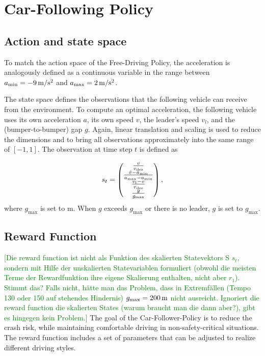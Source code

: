 \documentclass[review]{elsarticle}
\providecommand{\green}[1]{\textcolor{green}{#1}}
\providecommand{\martinc}[1]{\green{[#1]}} %
\providecommand{\sub}[1]{_{\mathrm{#1}}}  %
\providecommand{\3}{{\ss}}
\begin{document}
\section{Car-Following Policy}
\label{sec:CarFollowingPolicy}
\subsection{Action and state space}
\label{stateSpaceFollow}
To match the action space of the Free-Driving Policy, the acceleration is analogously defined as a continuous variable in the range between $a\sub{\rm min} = \unit[-9]{m/s^2}$ and 
$a\sub{\rm max} =\unit[2]{m/s^2}$.


The state space defines the observations that the following
vehicle can receive from the environment. To compute an optimal
acceleration, the following vehicle uses its own acceleration $a$,
its own speed $v$, the leader's speed $v_l$,
and the (bumper-to-bumper) gap $g$.
 Again, linear translation and scaling is used
to reduce the dimensions and to bring all observations approximately
into the same range of $[-1,1]$. The observation at time step $t$ is defined as

\begin{equation}
\label{eq:stateFollow}
s_t = 
\begin{pmatrix} 
\frac{v}{v\sub{des}} \\ 
\frac{\dot{v}-a\sub{\rm min}}{a\sub{\rm max} - a\sub{\rm min}}\\
\frac{v_l-v}{v\sub{des}}\\
\frac{g}{g\sub{\rm max}}

\end{pmatrix},
\end{equation}
%
where $g\sub{max}$ is set to  \unit[200]{m}. When $g$ exceeds  $g\sub{max}$ or there is no leader, $g$ is set to  $g\sub{max}$.

\subsection{Reward Function}
\label{rewardFunctionFollow}
\martinc{Die reward function ist nicht als Funktion des skalierten
  Statevektors S $s_t$, sondern mit Hilfe der unskalierten Statevariablen
  formuliert (obwohl die meisten Terme der Rewardfunktion ihre eigene
  Skalierung enthalten, nicht aber $r_1$). Stimmt das? Falls nicht, h\"atte man das Problem, dass
  in Extremf\"allen (Tempo 130 oder 150 auf stehendes Hindernis)
  $g\sub{max}=\unit[200]{m}$ nicht ausreicht. Ignoriert die reward
  function die skalierten States (warum braucht man die dann aber?),
  gibt es hingegen kein Problem.}
The goal of the Car-Follower-Policy is to reduce the crash risk, while
maintaining comfortable driving in non-safety-critical situations. The
reward function includes a set of parameters that can be
adjusted to realize different driving styles. 
\end{document}
